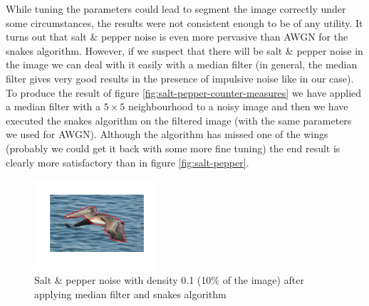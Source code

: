 While tuning the parameters could lead to segment the image correctly under some circumstances, the results were not consistent enough to be of any utility. It turns out that salt \& pepper noise is even more pervasive than AWGN for the snakes algorithm. However, if we suspect that there will be salt \& pepper noise in the image we can deal with it easily with a median filter (in general, the median filter gives very good results in the presence of impulsive noise like in our case). To produce the result of figure \ref{fig:salt-pepper-counter-measures} we have applied a median filter with a $5 \times 5$ neighbourhood to a noisy image and then we have executed the snakes algorithm on the filtered image (with the same parameters we used for AWGN). Although the algorithm has missed one of the wings (probably we could get it back with some more fine tuning) the end result is clearly more satisfactory than in figure \ref{fig:salt-pepper}.

\begin{figure}[!hbt]
\centering

\includegraphics[width=45mm]{img/ex2/saltpepper/0_1_fixed.png}

\caption{Salt \& pepper noise with density 0.1 (10\% of the image) after applying median filter and snakes algorithm}
\label{fig:salt-pepper-countermeasures}

\end{figure}
